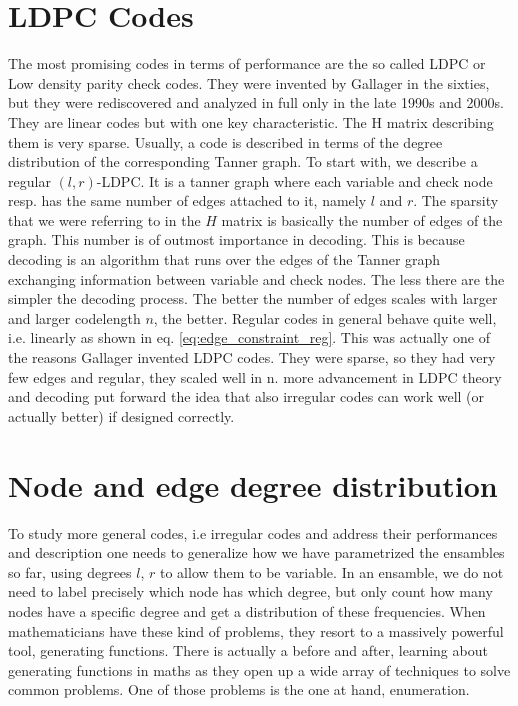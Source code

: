 \section{LDPC Codes}
The most promising codes in terms of performance are the so called LDPC or Low density parity check codes. They were invented by Gallager in the sixties, but they were rediscovered and analyzed in full only in the late 1990s and 2000s. They are linear codes but with one key characteristic. The H matrix describing them is very sparse. Usually, a code is described in terms of the degree distribution of the corresponding Tanner graph. To start with, we describe a regular $(l,r)$-LDPC. It is a tanner graph where each variable and check node resp. has the same number of edges attached to it, namely $l$ and $r$. The sparsity that we were referring to in the $H$ matrix is basically the number of edges of the graph. This number is of outmost importance in decoding. This is because decoding is an algorithm that runs over the edges of the Tanner graph exchanging information between variable and check nodes. The less there are the simpler the decoding process. The better the number of edges scales with larger and larger codelength $n$, the better. Regular codes in general behave quite well, i.e. linearly as shown in eq. \ref{eq:edge_constraint_reg}. This was actually one of the reasons Gallager invented LDPC codes. They were sparse, so they had very few edges and regular, they scaled well in n. more advancement in LDPC theory and decoding put forward the idea that also irregular codes can work well (or actually better) if designed correctly.

\section{Node and edge degree distribution}
To study more general codes, i.e irregular codes and address their performances and description one needs to generalize how we have parametrized the ensambles so far, using degrees $l$, $r$ to allow them to be variable. In an ensamble, we do not need to label precisely which node has which degree, but only count how many nodes have a specific degree and get a distribution of these frequencies. When mathematicians have these kind of problems, they resort to a massively powerful tool, generating functions. There is actually a before and after, learning about generating functions in maths as they open up a wide array of techniques to solve common problems. One of those problems is the one at hand, enumeration.

